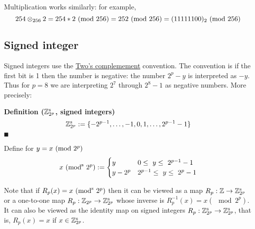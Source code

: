 \begin{example} Multiplication works similarly: for example,
\[
254 \ensuremath{\otimes}_{256} 2 = 254 * 2 \ ({\rm mod}\ 256) = 252 \ ({\rm mod}\ 256) = (11111100)_2 \ ({\rm mod}\ 256)
\]
\end{example}

\subsection{Signed integer}
Signed integers use the \href{https://epubs.siam.org/doi/abs/10.1137/1.9780898718072.ch3}{Two's complemement} convention. The convention is if the first bit is 1 then the number is negative: the number $2^p - y$ is interpreted as $-y$. Thus for $p = 8$ we are interpreting $2^7$ through $2^8-1$ as negative numbers. More precisely:

\textbf{Definition (${\mathbb Z}_{2^p}^{\rm s}$, signed integers)}
\[
{\mathbb Z}_{2^p}^{\rm s} := \{-2^{p-1} ,\ldots, -1 ,0,1, \ldots, 2^{p-1}-1 \}
\]
\ensuremath{\QED}

\begin{definition} Define for $y = x\ ({\rm mod}\ 2^p)$
\[
x\ ({\rm mod}^{\rm s}\ 2^p) := \begin{cases} y & 0 \ensuremath{\leq} y \ensuremath{\leq} 2^{p-1}-1 \\
                             y - 2^p & 2^{p-1} \ensuremath{\leq} y \ensuremath{\leq} 2^p - 1
                             \end{cases}
\]
\end{definition}

Note that if $R_p(x) = x\ ({\rm mod}^{\rm s}\ 2^p)$ then it can be viewed as a map $R_p : {\mathbb Z} \rightarrow {\mathbb Z}_{2^p}^{\rm s}$ or a one-to-one map $R_p : {\mathbb Z}_{2^p} \rightarrow {\mathbb Z}_{2^p}^{\rm s}$ whose inverse is $R_p^{-1}(x) = x (\mod 2^p)$. It can also be viewed as the identity map on signed integers $R_p : {\mathbb Z}_{2^p}^{\rm s} \rightarrow {\mathbb Z}_{2^p}^{\rm s}$, that is,  $R_p(x) = x$ if $x \in {\mathbb Z}_{2^p}^{\rm s}$.

